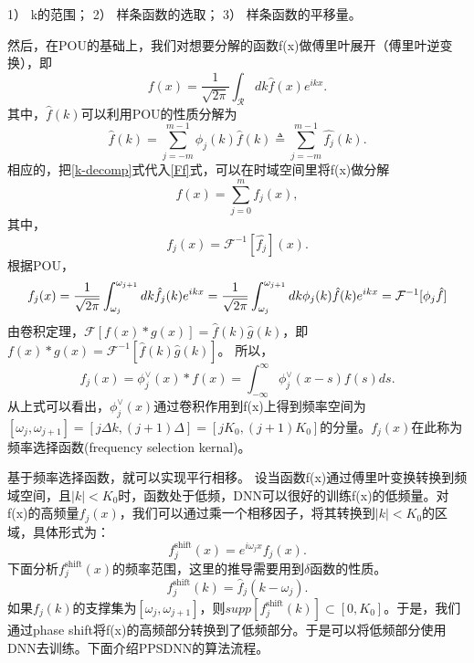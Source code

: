     1） k的范围；
    2） 样条函数的选取；
    3） 样条函数的平移量。


然后，在POU的基础上，我们对想要分解的函数f(x)做傅里叶展开（傅里叶逆变换），即
\begin{equation}
    f(x) = \frac{1}{\sqrt{2\pi}}\int_{\mathcal{R} }^{}dk\hat{f}(x)e^{ikx} . \label{Ff}
\end{equation}
其中，$\hat{f}(k)$可以利用POU的性质分解为
\begin{equation}
\widehat{f}(k)=
{\displaystyle\sum\limits_{j=-m}^{m-1}}
\phi_{j}(k)\widehat{f}(k)\triangleq
{\displaystyle\sum\limits_{j=-m}^{m-1}}
\widehat{f_{j}}(k). \label{k-decomp}
\end{equation}
相应的，把\ref{k-decomp}式代入\ref{Ff}式，可以在时域空间里将f(x)做分解
\begin{equation}
f(x)=
{\displaystyle\sum\limits_{j=0}^{m}}
f_{j}(x), \label{x-decomp}
\end{equation}
其中，
\[
f_{j}(x)=\mathcal{F}^{-1}[\widehat{f_{j}}](x).
\]
根据POU，
\begin{equation*}
    f_{j}(x) = \frac{1}{\sqrt{2\pi}}\int_{\omega _j }^{\omega_{j+1}}dk\hat{f_j}(k)e^{ikx}=\\
    \frac{1}{\sqrt{2\pi}}\int_{\omega _j }^{\omega_{j+1}}dk\phi_j(k)\hat{f}(k)e^{ikx}=\mathcal{F}^{-1}[\phi_j \hat{f}]
\end{equation*}
由卷积定理，$\mathcal{F}[f(x)*g(x)] = \hat{f}(k)\hat{g}(k)$，即$f(x)*g(x) = \mathcal{F}^{-1}[\hat{f}(k)\hat{g}(k)]$。
所以，
\begin{equation}
    f_j(x) = \phi_j^{\vee}(x)*f(x)=\int_{-\infty }^{\infty} \phi _j^{\vee}(x-s)f(s)ds .
\end{equation}
从上式可以看出，$\phi_j^{\vee}(x)$通过卷积作用到f(x)上得到频率空间为$[\omega_j,\omega_{j+1}]=[j\Delta k,(j+1)\Delta]=[jK_0,(j+1)K_0]$的分量。$f_j(x)$在此称为频率选择函数(frequency selection kernal)。

基于频率选择函数，就可以实现平行相移。
设当函数f(x)通过傅里叶变换转换到频域空间，且$|k|<K_0$时，函数处于低频，DNN可以很好的训练f(x)的低频量。对f(x)的高频量$f_j(x)$，我们可以通过乘一个相移因子，将其转换到$|k|<K_0$的区域，具体形式为：
\begin{equation}
    f_j^{\text{shift}}(x) = e^{i\omega_jx}f_j(x) .
\end{equation}
下面分析$f_j^{\text{shift}}(x)$的频率范围，这里的推导需要用到$\delta$函数的性质。
\begin{equation}
    f_j^{\text{shift}}(k) = \hat{f}_j(k-\omega_j) .
\end{equation}
如果$f_j(k)$的支撑集为$[\omega_j,\omega_{j+1}]$，则$supp[f_j^{\text{shift}}(k)]\subset [0,K_0]$。于是，我们通过phase shift将f(x)的高频部分转换到了低频部分。于是可以将低频部分使用DNN去训练。下面介绍PPSDNN的算法流程。


